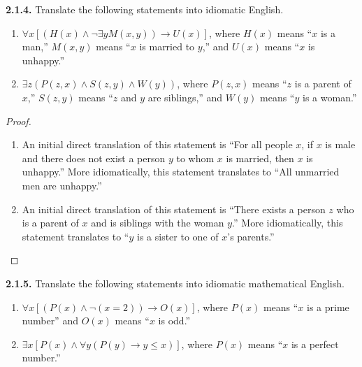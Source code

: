 \documentclass[12pt]{amsart}
\newenvironment{statement}[1]{\smallskip\noindent\color[rgb]{.6627, .3529, .6314} {\bf #1.}}{}
\theoremstyle{definition}
\theoremstyle{remark}
\begin{document}
\begin{statement}{2.1.4}
Translate the following statements into idiomatic English.
\begin{enumerate}
	\item $\forall x [(H(x) \wedge \neg \exists y M(x, y)) \rightarrow U(x)]$,
	where $H(x)$ means ``$x$ is a man,'' $M(x, y)$ means ``$x$ is married to $y$,''
	and $U(x)$ means ``$x$ is unhappy.''
	
	\item $\exists z (P(z, x) \wedge S(z, y) \wedge W(y))$,
	where $P(z, x)$ means ``$z$ is a parent of $x$,'' $S(z, y)$ means ``$z$ and $y$ are siblings,''
	and $W(y)$ means ``$y$ is a woman.''
\end{enumerate}
\end{statement}

\begin{proof}
\hfill
\begin{enumerate}
	\item An initial direct translation of this statement is 
	``For all people $x$, if $x$ is male and there does not exist a person $y$ to whom $x$ is married, then $x$ is unhappy.''
	More idiomatically, this statement translates to ``All unmarried men are unhappy.''
	
	\item An initial direct translation of this statement is 
	``There exists a person $z$ who is a parent of $x$ and is siblings with the woman $y$.''
	More idiomatically, this statement translates to ``$y$ is a sister to one of $x$'s parents.''
\end{enumerate}
\end{proof}


\begin{statement}{2.1.5}
Translate the following statements into idiomatic mathematical English.
\begin{enumerate}
	\item $\forall x [(P(x) \wedge \neg (x = 2)) \rightarrow O(x)]$,
	where $P(x)$ means ``$x$ is a prime number'' and $O(x)$ means ``$x$ is odd.''
	
	\item $\exists x [P(x) \wedge \forall y (P(y) \rightarrow y \leq x)]$,
	where $P(x)$ means ``$x$ is a perfect number.''
\end{enumerate}
\end{statement}
\end{document}
